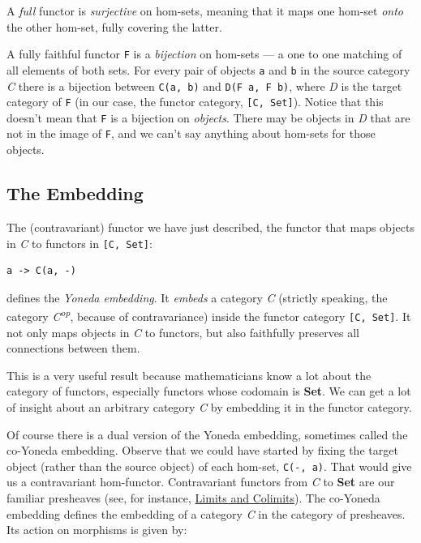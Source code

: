 A \emph{full} functor is \emph{surjective} on hom-sets, meaning that it
maps one hom-set \emph{onto} the other hom-set, fully covering the
latter.

A fully faithful functor \texttt{F} is a \emph{bijection} on hom-sets
--- a one to one matching of all elements of both sets. For every pair
of objects \texttt{a} and \texttt{b} in the source category \emph{C}
there is a bijection between \texttt{C(a,\ b)} and
\texttt{D(F\ a,\ F\ b)}, where \emph{D} is the target category of
\texttt{F} (in our case, the functor category, \texttt{{[}C,\ Set{]}}).
Notice that this doesn't mean that \texttt{F} is a bijection on
\emph{objects}. There may be objects in \emph{D} that are not in the
image of \texttt{F}, and we can't say anything about hom-sets for those
objects.

\subsection{The Embedding}\label{the-embedding}

The (contravariant) functor we have just described, the functor that
maps objects in \emph{C} to functors in \texttt{{[}C,\ Set{]}}:

\begin{verbatim}
a -> C(a, -)
\end{verbatim}

defines the \emph{Yoneda embedding}. It \emph{embeds} a category
\emph{C} (strictly speaking, the category \emph{C\textsuperscript{op}},
because of contravariance) inside the functor category
\texttt{{[}C,\ Set{]}}. It not only maps objects in \emph{C} to
functors, but also faithfully preserves all connections between them.

This is a very useful result because mathematicians know a lot about the
category of functors, especially functors whose codomain is
\textbf{Set}. We can get a lot of insight about an arbitrary category
\emph{C} by embedding it in the functor category.

Of course there is a dual version of the Yoneda embedding, sometimes
called the co-Yoneda embedding. Observe that we could have started by
fixing the target object (rather than the source object) of each
hom-set, \texttt{C(-,\ a)}. That would give us a contravariant
hom-functor. Contravariant functors from \emph{C} to \textbf{Set} are
our familiar presheaves (see, for instance,
\href{https://bartoszmilewski.com/2015/04/15/limits-and-colimits/}{Limits
and Colimits}). The co-Yoneda embedding defines the embedding of a
category \emph{C} in the category of presheaves. Its action on morphisms
is given by:

